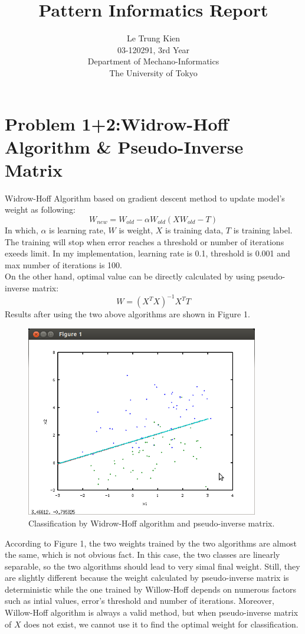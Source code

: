 \documentclass[a4paper, 11pt]{article}
\begin{document}
\title{Pattern Informatics Report}
\author{Le Trung Kien\\ 
  03-120291, 3rd Year \\
  Department of Mechano-Informatics \\ 
  The University of Tokyo
}
\maketitle


\section*{Problem 1+2:Widrow-Hoff Algorithm \& Pseudo-Inverse Matrix}
Widrow-Hoff Algorithm based on gradient descent method to update model's weight as following:
\[ W_{new} = W_{old} - \alpha W_{old} (X W_{old} - T)\]
In which, $\alpha$ is learning rate, $W$ is weight, $X$ is training data, $T$ is training label. The training will stop when error reaches a threshold or number of iterations exeeds limit. In my implementation, learning rate is 0.1, threshold is 0.001 and max number of iterations is 100. \\
On the other hand, optimal value can be directly calculated by using pseudo-inverse matrix:
\[ W = (X^{T}X)^{-1}X^TT\]
Results after using the two above algorithms are shown in Figure 1.
\begin{figure}[hbt]
  \centering
  \includegraphics[width=4in]{1-2.png}
  \caption[Close up of \textit{Hemidactylus} sp.]
  {Classification by Widrow-Hoff algorithm and pseudo-inverse matrix.}
\end{figure}

According to Figure 1, the two weights trained by the two algorithms are almost the same, which is not obvious fact. In this case, the two classes are linearly separable, so the two algorithms should lead to very simal final weight. Still, they are slightly different because the weight calculated by pseudo-inverse matrix is deterministic while the one trained by Willow-Hoff depends on numerous factors such as intial values, error's threshold and number of iterations. Moreover, Willow-Hoff algorithm is always a valid method, but when pseudo-inverse matrix of $X$ does not exist, we cannot use it to find the optimal weight for classification. \\
\end{document}
